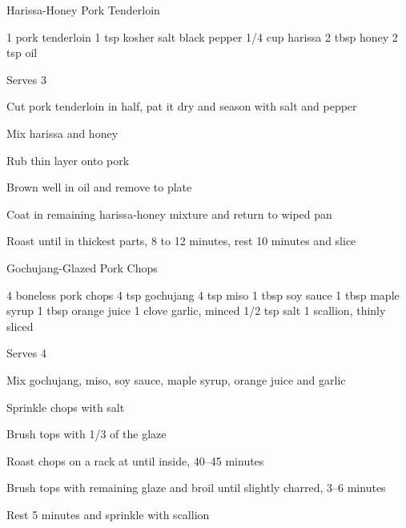 \begin{recipe}{Harissa-Honey Pork Tenderloin}{}
\begin{ingredients}
1 pork tenderloin
1 tsp kosher salt
black pepper
1/4 cup harissa
2 tbsp honey
2 tsp oil
\end{ingredients}
\nextcolumn
Serves 3
\begin{steps}
    \item Cut pork tenderloin in half, pat it dry and season with salt and pepper
    \item Mix harissa and honey
    \item Rub thin layer onto pork
    \item Brown well in oil and remove to plate
    \item Coat in remaining harissa-honey mixture and return to wiped pan
    \item Roast until  in thickest parts, 8 to 12 minutes, rest 10 minutes and slice
\end{steps}
\end{recipe}

\begin{recipe}{Gochujang-Glazed Pork Chops}{}
\begin{ingredients}
4 boneless pork chops
4 tsp gochujang
4 tsp miso
1 tbsp soy sauce
1 tbsp maple syrup
1 tbsp orange juice
1 clove garlic, minced
1/2 tsp salt
1 scallion, thinly sliced
\end{ingredients}
\nextcolumn
Serves 4
\begin{steps}
    \item Mix gochujang, miso, soy sauce, maple syrup, orange juice and garlic
    \item Sprinkle chops with salt
    \item Brush tops with 1/3 of the glaze
    \item Roast chops on a rack at  until  inside, 40--45 minutes
    \item Brush tops with remaining glaze and broil until slightly charred, 3--6 minutes
    \item Rest 5 minutes and sprinkle with scallion
\end{steps}
\end{recipe}

